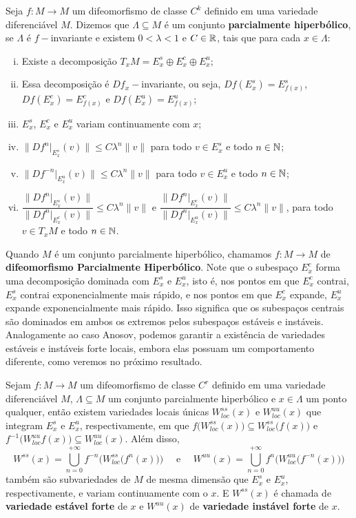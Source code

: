 \begin{definicao} Seja $f:M\to M$ um difeomorfismo de classe $C^k$ definido em uma variedade diferenciável $M$. Dizemos que $\Lambda\subseteq M$ é um conjunto \textbf{parcialmente hiperbólico}, se $\Lambda$ é $f-$invariante e existem $0<\lambda<1$ e $C\in\mathbb{R}$, tais que para cada $x\in\Lambda$:
\begin{enumerate}[i)]
\item Existe a decomposição $T_xM=E_x^s\oplus E_x^c\oplus E_x^u$;
\item Essa decomposição é $Df_x-$invariante, ou seja, $Df(E_x^s)=E_{f(x)}^s$, $Df(E_x^c)=E_{f(x)}^c$ e $Df(E_x^u)=E_{f(x)}^u$;
\item $E^s_x$, $E^c_x$ e $E^u_x$ variam continuamente com $x$;
\item $\|Df^n|_{E_x^s}(v)\|\leq C\lambda^n\|v\|$ para todo $v\in E^s_x$ e todo $n\in\mathbb{N}$;
\item $\|Df^{-n}|_{E_x^u}(v)\|\leq C\lambda^n\|v\|$ para todo $v\in E^u_x$ e todo $n\in\mathbb{N}$;
\item $\dfrac{\|Df^n|_{E^s_x}(v)\|}{\|Df^{n}|_{E^c_x}(v)\|}\leq C\lambda^n\|v\|$ e $\dfrac{\|Df^n|_{E^c_x}(v)\|}{\|Df^{n}|_{E^u_x}(v)\|}\leq C\lambda^n\|v\|$, para todo $v\in T_xM$ e todo $n\in\mathbb{N}$.
\end{enumerate}
\end{definicao}

Quando $M$ é um conjunto parcialmente hiperbólico, chamamos $f:M\to M$ de \textbf{difeomorfismo Parcialmente Hiperbólico}. Note que o subespaço $E_x^c$ forma uma decomposição dominada com $E_x^s$ e $E_x^u$, isto é, nos pontos em que $E_x^c$ contrai, $E_x^s$ contrai exponencialmente mais rápido, e nos pontos em que $E_x^c$ expande, $E_x^u$ expande exponencialmente mais rápido. Isso significa que os subespaços centrais são dominados em ambos os extremos pelos subespaços estáveis e instáveis. Analogamente ao caso Anosov, podemos garantir a existência de variedades estáveis e instáveis forte locais, embora elas possuam um comportamento diferente, como veremos no próximo resultado.

\begin{teorema} Sejam $f:M\to M$ um difeomorfismo de classe $C^r$ definido em uma variedade diferenciável $M$, $\Lambda\subseteq M$ um conjunto parcialmente hiperbólico e $x\in\Lambda$ um ponto qualquer, então existem variedades locais únicas $W^{ss}_{loc}(x)$ e $W^{uu}_{loc}(x)$ que integram $E^s_x$ e $E^u_x$, respectivamente, em que $f\big(W^{ss}_{loc}(x)\big)\subseteq W^{ss}_{loc}\big(f(x)\big)$ e $f^{-1}\big(W^{uu}_{loc}f(x)\big)\subseteq W^{uu}_{loc}(x)$. Além disso,
\begin{equation*}
W^{ss}(x)=\bigcup_{n=0}^{+\infty}f^{-n}\Big(W^{ss}_{loc}\big(f^{n}(x)\big)\Big)\quad\text{ e }\quad W^{uu}(x)=\bigcup_{n=0}^{+\infty}f^n\Big(W^{uu}_{loc}\big(f^{-n}(x)\big)\Big)
\end{equation*}
também são subvariedades de $M$ de mesma dimensão que $E^s_x$ e $E^u_x$, respectivamente, e variam continuamente com o $x$. E $W^{ss}(x)$ é chamada de \textbf{variedade estável forte} de $x$ e $W^{uu}(x)$ de \textbf{variedade instável forte} de $x$.
\end{teorema}

